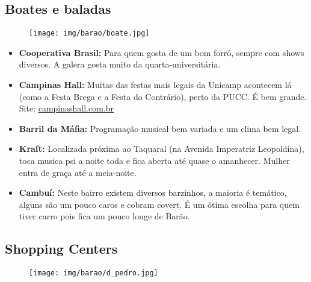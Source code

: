 \subsection{Boates e baladas}

\begin{figure}[h!]
    \centering
    \texttt{[image: img/barao/boate.jpg]}
\end{figure}

\begin{itemize}
    \item   \textbf{Cooperativa Brasil:} Para quem gosta de um bom forró,
    sempre com shows diversos. A galera gosta muito da quarta-universitária.

    \item   \textbf{Campinas Hall:} Muitas das festas mais legais da Unicamp
        acontecem lá (como a Festa Brega e a Festa do Contrário), perto da
        PUCC. É bem grande.
        \\Site: \url{campinashall.com.br}

    \item   \textbf{Barril da Máfia:} Programação musical bem variada e um
        clima bem legal.

    \item   \textbf{Kraft:} Localizada próxima ao Taquaral (na Avenida
        Imperatriz Leopoldina), toca musica psi a noite toda e fica aberta até
        quase o amanhecer. Mulher entra de graça até a meia-noite.

    \item   \textbf{Cambuí:} Neste bairro existem diversos barzinhos, a maioria
        é temático, alguns são um pouco caros e cobram covert. É um ótima
        escolha para quem tiver carro pois fica um pouco longe de Barão.
\end{itemize}

\subsection{Shopping Centers}

\begin{figure}[h!]
    \centering
    \texttt{[image: img/barao/d\_pedro.jpg]}
\end{figure}

